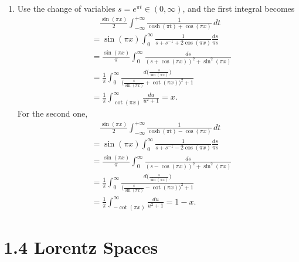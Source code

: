\begin{enumerate}
\item[1.3.8.]
   Use the change of variables $s=e^{\pi t}\in(0,\infty)$, and the first integral becomes
   \begin{align*}&\ \ \ \ \,\frac{\sin(\pi x)}{2}\int_{-\infty}^{+\infty}\frac{1}{\cosh(\pi t)+\cos(\pi x)}\,dt\\
   &=\sin(\pi x)\int_0^\infty\frac{1}{s+s^{-1}+2\cos(\pi x)}\frac{ds}{\pi s}\\
   &=\frac{\sin(\pi x)}{\pi}\int_0^\infty\frac{ds}{(s+\cos(\pi x))^2+\sin^2(\pi x)}\\
   &=\frac{1}{\pi}\int_0^\infty\frac{d\big(\frac{s}{\sin(\pi x)}\big)}{\big(\frac{s}{\sin(\pi x)}+\cot(\pi x))^2+1}\\
   &=\frac{1}{\pi}\int_{\cot(\pi x)}^\infty\frac{du}{u^2+1}=x.\end{align*}
   For the second one,
   \begin{align*}&\ \ \ \ \,\frac{\sin(\pi x)}{2}\int_{-\infty}^{+\infty}\frac{1}{\cosh(\pi t)-\cos(\pi x)}\,dt\\
   &=\sin(\pi x)\int_0^\infty\frac{1}{s+s^{-1}-2\cos(\pi x)}\frac{ds}{\pi s}\\
   &=\frac{\sin(\pi x)}{\pi}\int_0^\infty\frac{ds}{(s-\cos(\pi x))^2+\sin^2(\pi x)}\\
   &=\frac{1}{\pi}\int_0^\infty\frac{d\big(\frac{s}{\sin(\pi x)}\big)}{\big(\frac{s}{\sin(\pi x)}-\cot(\pi x))^2+1}\\
   &=\frac{1}{\pi}\int_{-\cot(\pi x)}^\infty\frac{du}{u^2+1}=1-x.\end{align*}
\end{enumerate}

\section*{1.4 Lorentz Spaces}

